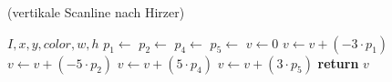 \begin{algorithm}[!ht]
\caption{ (vertikale Scanline nach Hirzer)}
\label{alg:convolutekernelhirzer-vertical}
\begin{algorithmic}[1]
	\Require $I,x,y,\mathit{color},w,h$
	\State $p_1 \gets$ 
	\State $p_2 \gets$ 
	\State $p_4 \gets$ 
	\State $p_5 \gets$ 
	\State $v \gets 0$
	\State $v \gets v + \left( -3 \cdot p_1 \right)$
	\State $v \gets v + \left( -5 \cdot p_2 \right)$
	\State $v \gets v + \left( 5 \cdot p_4 \right)$
	\State $v \gets v + \left( 3 \cdot p_5 \right)$
	\State \textbf{return} $v$
\end{algorithmic}
\end{algorithm}
